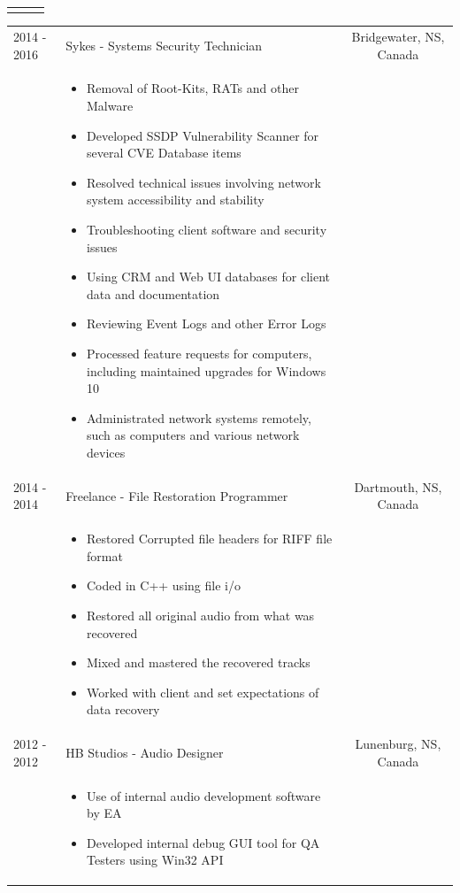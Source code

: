 \documentclass{res}
\newcommand{\frstCVcell}{2.5cm}
\begin{document}
\begin{resume}
\begin{tabularx}{\textwidth}{p{\frstCVcell}Xc}
    & \\
      \end{tabularx}
    \pagebreak
    \begin{tabularx}{\textwidth}{p{\frstCVcell}Xc}
    2014 - 2016 & Sykes - Systems Security Technician & Bridgewater, NS, Canada\\
    &
    \begin{itemize}
    \item Removal of Root-Kits, RATs and other Malware
    \item Developed SSDP Vulnerability Scanner for several CVE Database items
    \item Resolved technical issues involving network system accessibility and stability
    \item Troubleshooting client software and security issues
    \item Using CRM and Web UI databases for client data and documentation
    \item Reviewing Event Logs and other Error Logs
    \item Processed feature requests for computers, including maintained upgrades for Windows 10
    \item Administrated network systems remotely, such as computers and various network devices
    \end{itemize}
    & \\
    2014 - 2014 & Freelance - File Restoration Programmer & Dartmouth, NS, Canada\\
    &
    \begin{itemize}
    \item Restored Corrupted file headers for RIFF file format
    \item Coded in C++ using file i/o
    \item Restored all original audio from what was recovered
    \item Mixed and mastered the recovered tracks
    \item Worked with client and set expectations of data recovery
    \end{itemize}
    & \\
    2012 - 2012 & HB Studios - Audio Designer & Lunenburg, NS, Canada\\
    &
    \begin{itemize}
    \item Use of internal audio development software by EA
    \item Developed internal debug GUI tool for QA Testers using Win32 API

\end{itemize}
\end{tabularx}
\end{resume}
\end{document}
